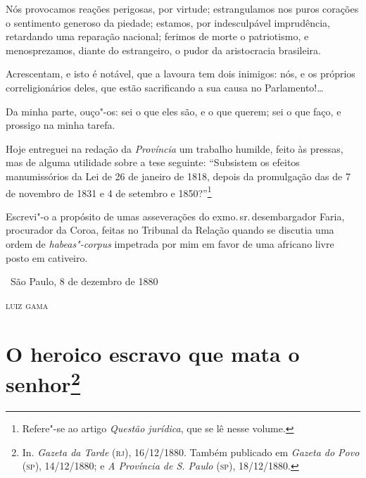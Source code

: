 Nós provocamos reações perigosas, por virtude; estrangulamos nos puros
corações o sentimento generoso da piedade; estamos, por indesculpável
imprudência, retardando uma reparação nacional; ferimos de morte o
patriotismo, e menosprezamos, diante do estrangeiro, o pudor da
aristocracia brasileira.

Acrescentam, e isto é notável, que a lavoura tem dois inimigos: nós, e
os próprios correligionários deles, que estão sacrificando a sua causa
no Parlamento!\ldots{}

Da minha parte, ouço"-os: sei o que eles são, e o que querem; sei o que
faço, e prossigo na minha tarefa.

Hoje entreguei na redação da \emph{Província} um trabalho humilde, feito
às pressas, mas de alguma utilidade sobre a tese seguinte: ``Subsistem os
efeitos manumissórios da Lei de 26 de janeiro de 1818, depois da
promulgação das de 7 de novembro de 1831 e 4 de setembro e
1850?''\footnote{Refere"-se ao artigo \emph{Questão jurídica}, que se lê
  nesse volume.}

Escrevi"-o a propósito de
umas asseverações do exmo.\,sr.\,desembargador Faria, procurador da Coroa,
feitas no Tribunal da Relação quando se discutia uma ordem de
\emph{habeas"-corpus} impetrada por mim em favor de uma africano livre
posto em cativeiro.

\medskip

\hfill\ São Paulo, 8 de dezembro de 1880\medskip

\hfill\textsc{luiz gama}

\chapter{O heroico escravo que mata o senhor\footnote[*]{In.
  \emph{Gazeta da Tarde} (\textsc{rj}), 16/12/1880. Também publicado em
  \emph{Gazeta do Povo} (\textsc{sp}), 14/12/1880; e \emph{A Província de S.
  Paulo} (\textsc{sp}), 18/12/1880.}}

